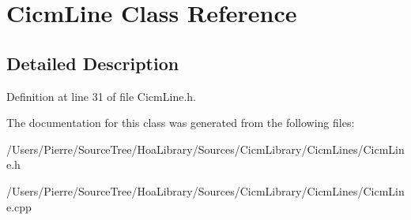 \hypertarget{class_cicm_line}{\section{Cicm\-Line Class Reference}
\label{class_cicm_line}
}


\subsection{Detailed Description}


Definition at line 31 of file Cicm\-Line.\-h.



The documentation for this class was generated from the following files\-:\begin{DoxyCompactItemize}
\item 
/\-Users/\-Pierre/\-Source\-Tree/\-Hoa\-Library/\-Sources/\-Cicm\-Library/\-Cicm\-Lines/Cicm\-Line.\-h\item 
/\-Users/\-Pierre/\-Source\-Tree/\-Hoa\-Library/\-Sources/\-Cicm\-Library/\-Cicm\-Lines/Cicm\-Line.\-cpp\end{DoxyCompactItemize}

